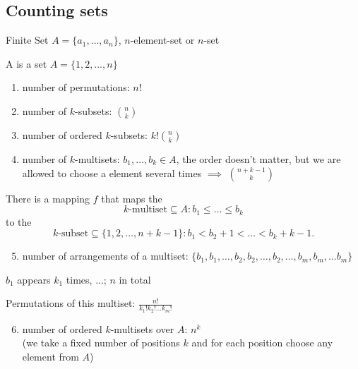 

\subsection{Counting sets}
Finite Set $A = \{a_1, \ldots, a_n\}$, $n$-element-set or $n$-set

A  is a set $A = \{1, 2, \ldots, n\}$

\begin{enumerate}
  \item number of permutations: $n!$
  \item number of $k$-subsets: ${n\choose k}$
  \item number of ordered $k$-subsets: $k! {n\choose k}$
  \item number of $k$-multisets: $b_1, \ldots, b_k \in A$, the order doesn't matter, but we are allowed to choose a element several times $\implies$ ${n +k-1 \choose k}$
\end{enumerate}

There is a mapping $f$ that maps the
\[
  \text{$k$-multiset}
  \subseteq A:
  b_1 ≤ \ldots ≤ b_k
\]
to the
\[
  \text{$k$-subset}
  \subseteq \{1,2,\ldots,n+k-1\}:
  b_1 < b_2+1 < \ldots < b_k+k-1.
\]

\begin{enumerate} 
  \setcounter{enumi}{4}
  \item number of arrangements of a multiset: $\{b_1, b_1, \ldots , b_2, b_2,\ldots, b_2, \ldots, b_m, b_m, \ldots b_m\}$ 
\end{enumerate}

$b_1$ appears $k_1$ times, ...; $n$ in total

Permutations of this multiset:
$\frac{n!}{k_1! k_2! \ldots k_m!}$

\begin{enumerate}
  \setcounter{enumi}{5}
  \item number of ordered $k$-multisets over $A$: $n^k$ \\
  (we take a fixed number of positions $k$ and for each position choose any element from $A$)
\end{enumerate}

